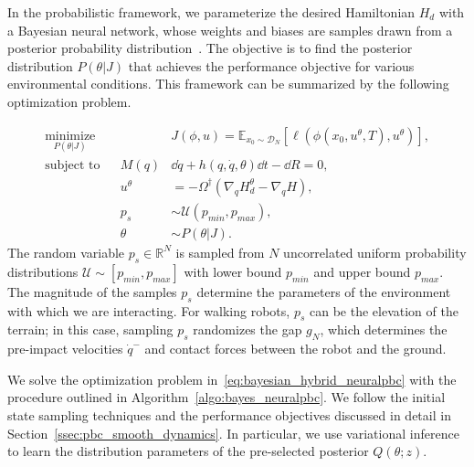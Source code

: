In the probabilistic framework, we parameterize the desired Hamiltonian $H_d$
with a Bayesian neural network, whose weights and biases are samples drawn from
a posterior probability distribution~\cite{jospin2020hands}.
%
The objective is to find the posterior distribution $P(\theta |J)$ that achieves
the performance objective for various environmental conditions.
%
This framework can be summarized by the following optimization problem.

\begin{equation}
    \begin{aligned}
        \underset{P(\theta | J)}{\textrm{minimize}} 
        & & & J(\phi, u) = \mathbb{E}_{x_0 \sim \mathcal{D}_N}[ \ell(\phi(x_0, u^\theta, T), u^\theta)], \\
        \textrm{subject to}
        & & M(q) &\dd \dot{q} + h(q, \dot{q}, \theta)\dd t - \dd R  = 0,\\
        & & u^{\theta} &= -\Omega^{\dagger} (\nabla_q H_d^{\theta} - \nabla_q H), \\
        & & p_s &\sim \mathcal{U}(p_{min}, p_{max}), \\
        & & \theta &\sim P(\theta | J).
    \end{aligned}
    \label{eq:bayesian_hybrid_neuralpbc}
\end{equation}
\noindent The random variable $p_s \in \mathbb{R}^{N}$ is sampled from $N$
uncorrelated uniform probability distributions $\mathcal{U} \sim [p_{min}, p_{max}]$
with lower bound $p_{min}$ and upper bound $p_{max}$.
%
The magnitude of the samples $p_s$ determine the parameters of the environment with which we are interacting.
For walking robots, $p_s$ can be the elevation of the terrain; in this case, sampling $p_s$ randomizes the gap $g_N$, which determines the pre-impact velocities
$\dot{q}^{-}$ and contact forces between the robot and the ground.

We solve the optimization problem in~\eqref{eq:bayesian_hybrid_neuralpbc} with the procedure outlined in Algorithm~\eqref{algo:bayes_neuralpbc}. 
%
We follow the initial state sampling techniques and the performance objectives discussed in detail in Section~\ref{ssec:pbc_smooth_dynamics}.
In particular, we use variational inference to learn the distribution parameters of the pre-selected posterior $Q(\theta;z)$.

